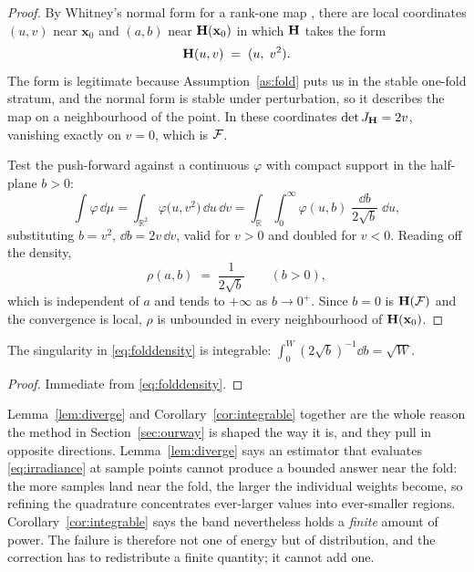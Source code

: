 \begin{proof}
By Whitney's normal form for a rank-one map \cite{whitney1955,golubitsky1986},
there are local coordinates $(u,v)$ near $\mathbf{x}_0$ and $(a,b)$ near
$\mathbf{H}(\mathbf{x}_0)$ in which $\mathbf{H}$ takes the form
\begin{equation}
\mathbf{H}(u,v) \;=\; (u,\; v^2) .
\label{eq:normalform}
\end{equation}
The form is legitimate because Assumption~\ref{as:fold} puts us in the stable
one-fold stratum, and the normal form is stable under perturbation, so it
describes the map on a neighbourhood of the point. In these
coordinates $\det J_{\mathbf{H}} = 2v$, vanishing exactly on $v = 0$, which is
$\mathcal{F}$.

Test the push-forward against a continuous $\varphi$ with compact support in the
half-plane $b > 0$:
\begin{equation}
\int \varphi \,\dd\mu
= \int_{\mathbb{R}^2} \varphi\big(u, v^2\big) \,\dd u \,\dd v
= \int_{\mathbb{R}}\!\!\int_{0}^{\infty}
\varphi(u,b)\;\frac{\dd b}{2\sqrt{b}}\;\dd u ,
\end{equation}
substituting $b = v^2$, $\dd b = 2v\,\dd v$, valid for $v > 0$ and doubled for
$v<0$. Reading off the density,
\begin{equation}
\rho(a,b) \;=\; \frac{1}{2\sqrt{b}} \qquad (b>0),
\label{eq:folddensity}
\end{equation}
which is independent of $a$ and tends to $+\infty$ as $b \to 0^+$. Since
$b = 0$ is $\mathbf{H}(\mathcal{F})$ and the convergence is local, $\rho$ is unbounded in
every neighbourhood of $\mathbf{H}(\mathbf{x}_0)$.
\end{proof}

\begin{corollary}
\label{cor:integrable}
The singularity in \eqref{eq:folddensity} is integrable:
$\int_0^{W} (2\sqrt{b})^{-1} \dd b = \sqrt{W}$.
\end{corollary}

\begin{proof}
Immediate from \eqref{eq:folddensity}.
\end{proof}

Lemma~\ref{lem:diverge} and Corollary~\ref{cor:integrable} together are the
whole reason the method in Section~\ref{sec:ourway} is shaped the way it is, and
they pull in opposite directions. Lemma~\ref{lem:diverge} says an estimator that
evaluates \eqref{eq:irradiance} at sample points cannot produce a bounded answer
near the fold: the more samples land near the fold, the larger the individual
weights become, so refining the quadrature concentrates ever-larger values into
ever-smaller regions. Corollary~\ref{cor:integrable} says the band nevertheless
holds a \emph{finite} amount of power. The failure is therefore not one of
energy but of distribution, and the correction has to redistribute a finite quantity; it cannot add one.

